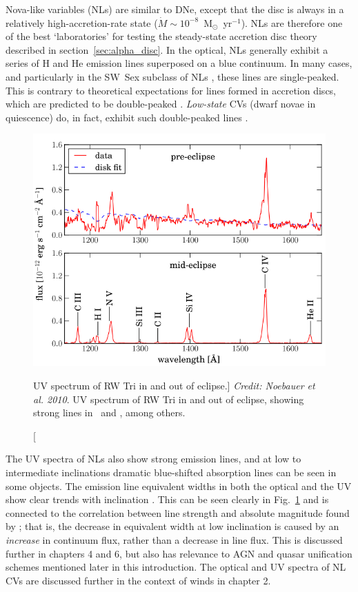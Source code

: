 Nova-like variables (NLs) are similar to DNe,
except that the disc is always in a relatively 
high-accretion-rate state ($\dot{M} \sim 10^{-8}$~M$_{\odot}$~yr$^{-1}$).
NLs are therefore one of the best `laboratories' for testing the steady-state
accretion disc theory described in section~\ref{sec:alpha_disc}.
In the optical, NLs generally exhibit a series of H and He emission 
lines superposed on a blue continuum. In many
cases, and particularly in the SW~Sex subclass of NLs
\citep{HSK86,DR95}, these lines are single-peaked. This is contrary to
theoretical expectations for lines formed in accretion discs, which
are predicted to be double-peaked \citep{smak1981, hornemarsh1986}. 
{\em Low-state} CVs (dwarf novae in quiescence) do, in fact,
exhibit such double-peaked lines \citep{marshhorne1990}. 

\nocite{dhillon1996,hessman1984}
\begin{figure}
\centering
\includegraphics[width=1.0\textwidth]{figures/02-outflows/rwtri_noe.png}
\caption
[UV spectrum of RW Tri in and out of eclipse.]
{
{\sl Credit: Noebauer et al. 2010}.
UV spectrum of RW Tri in and out of eclipse, showing strong lines in 
\civfull\ and \la, among others.
} 
\label{fig:NL_spec}
\end{figure}


The UV spectra of NLs also show strong emission lines, and at 
low to intermediate inclinations dramatic blue-shifted absorption lines
can be seen in some objects. The emission line equivalent widths
in both the optical and the UV show clear trends with 
inclination \citep{hessman1984,echevarria1988,noebauer}. 
This can be seen clearly in Fig.~\ref{fig:NL_spec} and is connected to
the correlation between line strength and absolute magnitude 
found by \cite{patterson1984};
that is, the decrease in equivalent width at low inclination is caused by an {\em increase} in continuum flux, rather than a decrease in line flux. 
This is discussed further in chapters 4 and 6, but also has 
relevance to AGN and quasar unification schemes mentioned later in this introduction.
The optical and UV spectra of NL CVs are discussed further
in the context of winds in chapter 2.

